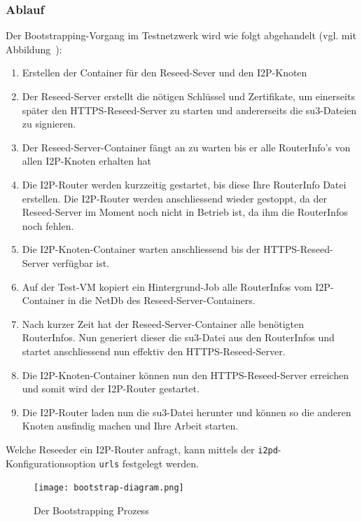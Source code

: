 \subsubsection{Ablauf}

Der Bootstrapping-Vorgang im Testnetzwerk wird wie folgt abgehandelt (vgl. mit Abbildung~):

\begin{enumerate}
    \item Erstellen der Container für den Reseed-Sever und den I2P-Knoten
    \item Der Reseed-Server erstellt die nötigen Schlüssel und Zertifikate, um einerseits später den HTTPS-Reseed-Server zu starten und andererseits die su3-Dateien zu signieren.
    \item Der Reseed-Server-Container fängt an zu warten bis er alle RouterInfo's von allen I2P-Knoten erhalten hat
    \item Die I2P-Router werden kurzzeitig gestartet, bis diese Ihre RouterInfo Datei erstellen. Die I2P-Router werden anschliessend wieder gestoppt, da der Reseed-Server im Moment noch nicht in Betrieb ist, da ihm die RouterInfos noch fehlen.
    \item Die I2P-Knoten-Container warten anschliessend bis der HTTPS-Reseed-Server verfügbar ist.
    \item Auf der Test-VM kopiert ein Hintergrund-Job alle RouterInfos vom I2P-Container in die NetDb des Reseed-Server-Containers.
    \item Nach kurzer Zeit hat der Reseed-Server-Container alle benötigten RouterInfos. Nun generiert dieser die su3-Datei aus den RouterInfos und startet anschliessend nun effektiv den HTTPS-Reseed-Server.
    \item Die I2P-Knoten-Container können nun den HTTPS-Reseed-Server erreichen und somit wird der I2P-Router gestartet.
    \item Die I2P-Router laden nun die su3-Datei herunter und können so die anderen Knoten ausfindig machen und Ihre Arbeit starten.
\end{enumerate}

Welche Reseeder ein I2P-Router anfragt, kann mittels der \lstinline|i2pd|-Konfigurationsoption \lstinline|urls| festgelegt werden.


\begin{landscape}%
\begin{figure}[ht]
  \texttt{[image: bootstrap-diagram.png]}
  \caption{Der Bootstrapping Prozess}\label{fig:bootstrap-diagram}
\end{figure}
\end{landscape}%


